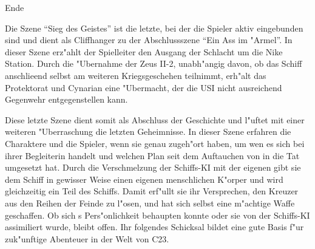 \begin{remarks}
	\begin{center}\huge{}Ende\end{center}

	Die Szene ``Sieg des Geistes'' ist die letzte, bei der die Spieler aktiv eingebunden sind und dient als Cliffhanger zu der Abschlussszene ``Ein Ass im "Armel''. In dieser Szene erz"ahlt der Spielleiter den Ausgang der Schlacht um die Nike Station. Durch die "Ubernahme der Zeus II-2, unabh"angig davon, ob das Schiff anschlie\3end selbst am weiteren Kriegsgeschehen teilnimmt, erh"alt das Protektorat und Cynarian eine "Ubermacht, der die USI nicht ausreichend Gegenwehr entgegenstellen kann.

	Diese letzte Szene dient somit als Abschluss der Geschichte und l"uftet mit einer weiteren "Uberraschung die letzten Geheimnisse. In dieser Szene erfahren die Charaktere und die Spieler, wenn sie genau zugeh"ort haben, um wen es sich bei ihrer Begleiterin handelt und welchen Plan \xl{} seit dem Auftauchen von \ml{} in die Tat umgesetzt hat. Durch die Verschmelzung der Schiffs-KI mit der eigenen gibt sie dem Schiff in gewisser Weise einen eigenen menschlichen K"orper und wird gleichzeitig ein Teil des Schiffs. Damit erf"ullt sie ihr Versprechen, den Kreuzer aus den Reihen der Feinde zu l"osen, und hat sich selbst eine m"achtige Waffe geschaffen. Ob sich \xl{}s Pers"onlichkeit behaupten konnte oder sie von der Schiffs-KI assimiliert wurde, bleibt offen. Ihr folgendes Schicksal bildet eine gute Basis f"ur zuk"unftige Abenteuer in der Welt von C23.
\end{remarks}
\vfill\pagebreak
